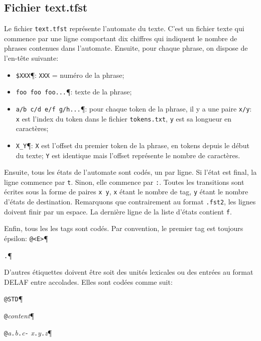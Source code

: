 \subsection{Fichier text.tfst}
\label{section-tfst-format}
Le fichier \verb+text.tfst+ représente l’automate du texte. C'est un fichier texte  qui commence par une ligne comportant dix chiffres qui indiquent le nombre de phrases contenues dans l'automate. Ensuite, pour chaque phrase, on dispose de l'en-tête suivante:


\begin{itemize}
\item \verb+$XXX+\P : \verb+XXX+ = numéro de la phrase;

\item \verb+foo foo foo...+\P : texte de la phrase;

\item \verb+a/b c/d e/f g/h...+\P : pour chaque token de la phrase, il y a une 
	paire \verb+x/y+: \verb+x+ est l'index du token dans le fichier
	\verb+tokens.txt+, \verb+y+ est sa longueur en caractères;

\item \verb+X_Y+\P : \verb+X+ est l'offset du premier token de la phrase, en tokens depuis le début
du texte; \verb+Y+ est identique mais l'offset représente le nombre de caractères.
\end{itemize}


\bigskip
\noindent Ensuite, tous les états de l'automate sont codés, un par ligne. Si l'état est final, la
ligne commence par \verb+t+. Sinon, elle commence par \verb+:+. Toutes les transitions sont écrites
sous la forme de paires \verb+x y+, \verb+x+ étant le nombre de tag, \verb+y+ étant le nombre
d'états de destination. Remarquons que contrairement au format \verb+.fst2+, les lignes doivent
finir par un espace. La dernière ligne de la liste d'états contient \verb+f+. 

\bigskip
\noindent Enfin, tous les les tags sont codés. Par convention, le premier tag est toujours épsilon:
\bigskip
\noindent \verb$@<E>$\P

\noindent \verb$.$\P


\bigskip
\noindent D'autres étiquettes doivent être soit des unités lexicales ou des entrées au format DELAF
entre accolades. Elles sont codées comme suit:

\bigskip
\noindent \verb$@STD$\P

\noindent \verb$@$\textit{content}\P

\noindent \verb$@$\textit{a}\verb$.$\textit{b}\verb$.$\textit{c}\verb$-$
\textit{x}\verb$.$\textit{y}\verb$.$\textit{z}\P

